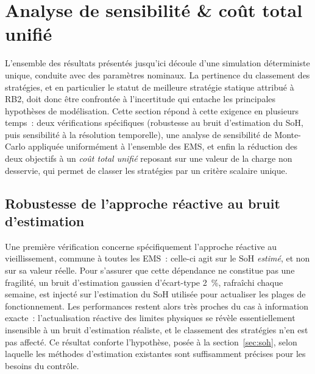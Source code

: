 
\section{Analyse de sensibilité \& coût total unifié}
\label{sec:sensibilite}

L'ensemble des résultats présentés jusqu'ici découle d'une simulation déterministe unique, conduite avec des paramètres nominaux. La pertinence du classement des stratégies, et en particulier le statut de meilleure stratégie statique attribué à RB2, doit donc être confrontée à l'incertitude qui entache les principales hypothèses de modélisation. Cette section répond à cette exigence en plusieurs temps~: deux vérifications spécifiques (robustesse au bruit d'estimation du SoH, puis sensibilité à la résolution temporelle), une analyse de sensibilité de Monte-Carlo appliquée uniformément à l'ensemble des EMS, et enfin la réduction des deux objectifs à un \emph{coût total unifié} reposant sur une valeur de la charge non desservie, qui permet de classer les stratégies par un critère scalaire unique.

\subsection{Robustesse de l'approche réactive au bruit d'estimation}

Une première vérification concerne spécifiquement l'approche réactive au vieillissement, commune à toutes les EMS~: celle-ci agit sur le SoH \emph{estimé}, et non sur sa valeur réelle. Pour s'assurer que cette dépendance ne constitue pas une fragilité, un bruit d'estimation gaussien d'écart-type \SI{2}{\percent}, rafraîchi chaque semaine, est injecté sur l'estimation du SoH utilisée pour actualiser les plages de fonctionnement. Les performances restent alors très proches du cas à information exacte~: l'actualisation réactive des limites physiques se révèle essentiellement insensible à un bruit d'estimation réaliste, et le classement des stratégies n'en est pas affecté. Ce résultat conforte l'hypothèse, posée à la section~\ref{sec:soh}, selon laquelle les méthodes d'estimation existantes sont suffisamment précises pour les besoins du contrôle.

